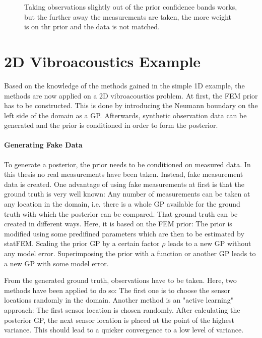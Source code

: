 \documentclass[%
  a4paper,oneside,%
  11pt,%
  smallchapters,
  style=printdev,
  extramargin,
  green,%
  rgb, <cmyk>
  ]{tubsbook}
\begin{document}
\begin{figure}[!ht]
\caption{Taking observations slightly out of the prior confidence bands works, but the further away the measurements are taken, the more weight is on thr prior and the data is not matched.}
\end{figure}
%
\section{2D Vibroacoustics Example}
Based on the knowledge of the methods gained in the simple 1D example, the methods are now applied on a 2D vibroacoustics problem. At first, the FEM prior has to be constructed. This is done by introducing the Neumann boundary on the left side of the domain as a GP. Afterwards, synthetic observation data can be generated and the prior is conditioned in order to form the posterior.

\paragraph{Generating Fake Data}
To generate a posterior, the prior needs to be conditioned on measured data. In this thesis no real measurements have been taken. Instead, fake measurement data is created. One advantage of using fake measurements at first is that the ground truth is very well known: Any number of measurements can be taken at any location in the domain, i.e. there is a whole GP available for the ground truth with which the posterior can be compared.
That ground truth can be created in different ways. Here, it is based on the FEM prior: The prior is modified using some predifined parameters which are then to be estimated by statFEM. Scaling the prior GP by a certain factor $\rho$ leads to a new GP without any model error. Superimposing the prior with a function or another GP leads to a new GP with some model error.

From the generated ground truth, observations have to be taken. Here, two methods have been applied to do so: The first one is to choose the sensor locations randomly in the domain. Another method is an "active learning" approach: The first sensor location is chosen randomly. After calculating the posterior GP, the next sensor location is placed at the point of the highest variance. This should lead to a quicker convergence to a low level of variance.
\end{document}
